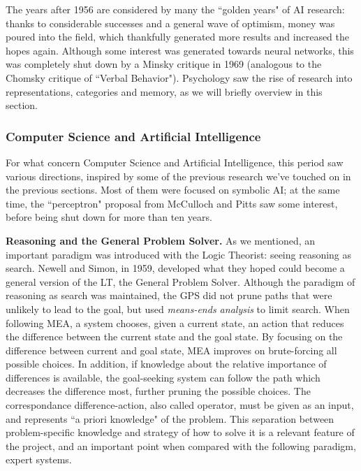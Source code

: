 \documentclass[../main.tex]{subfiles}
\begin{document}
The years after 1956 are considered by many the ``golden years" of AI research: thanks to considerable successes and a general wave of optimism, money was poured into the field, which thankfully generated more results and increased the hopes again. Although some interest was generated towards neural networks, this was completely shut down by a Minsky critique in 1969 (analogous to the Chomsky critique of ``Verbal Behavior"). Psychology saw the rise of research into representations, categories and memory, as we will briefly overview in this section.

\subsubsection{Computer Science and Artificial Intelligence}
For what concern Computer Science and Artificial Intelligence, this period saw various directions, inspired by some of the previous research we've touched on in the previous sections. Most of them were focused on symbolic AI; at the same time, the ``perceptron" proposal from McCulloch and Pitts saw some interest, before being shut down for more than ten years.

\vspace{4pt}
\textbf{Reasoning and the General Problem Solver.}
As we mentioned, an important paradigm was introduced with the Logic Theorist: seeing reasoning as search. Newell and Simon, in 1959, developed what they hoped could become a general version of the LT, the General Problem Solver. Although the paradigm of reasoning as search was maintained, the GPS did not prune paths that were unlikely to lead to the goal, but used \textit{means-ends analysis} to limit search. When following MEA, a system chooses, given a current state, an action that reduces the difference between the current state and the goal state. By focusing on the difference between current and goal state, MEA improves on brute-forcing all possible choices. In addition, if knowledge about the relative importance of differences is available, the goal-seeking system can follow the path which decreases the difference most, further pruning the possible choices. The correspondance difference-action, also called operator, must be given as an input, and represents ``a priori knowledge" of the problem. This separation between problem-specific knowledge and strategy of how to solve it is a relevant feature of the project, and an important point when compared with the following paradigm, expert systems.
\end{document}
